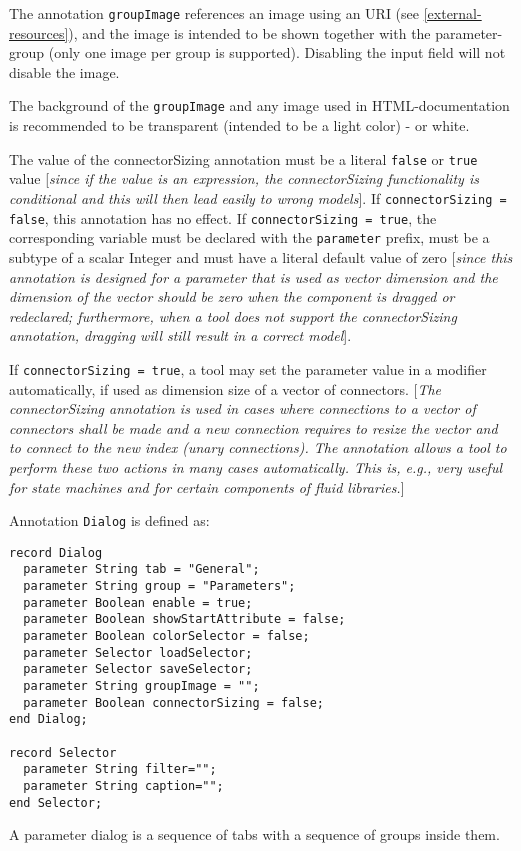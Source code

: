 The annotation \lstinline!groupImage! references an image using an URI (see
\autoref{external-resources}), and the image is intended to be shown together with the
parameter-group (only one image per group is supported). Disabling the
input field will not disable the image.

The background of the \lstinline!groupImage! and any image used in HTML-documentation is recommended to be transparent (intended to be a light color) - or white.

The value of the connectorSizing annotation must be a literal
\lstinline!false! or \lstinline!true! value {[}\emph{since if the value is an
expression, the connectorSizing functionality is conditional and this
will then lead easily to wrong models}{]}. If \lstinline!connectorSizing = false!, this annotation has no effect.
If \lstinline!connectorSizing = true!, the corresponding variable must be declared with the
\lstinline!parameter! prefix, must be a subtype of a scalar Integer and
must have a literal default value of zero {[}\emph{since this annotation
is designed for a parameter that is used as vector dimension and the
dimension of the vector should be zero when the component is dragged or
redeclared; furthermore, when a tool does not support the
connectorSizing annotation, dragging will still result in a correct
model}{]}.

If \lstinline!connectorSizing = true!, a tool may set the parameter value
in a modifier automatically, if used as dimension size of a vector of
connectors. {[}\emph{The connectorSizing annotation is used in cases
where connections to a vector of connectors shall be made and a new
connection requires to resize the vector and to connect to the new index
(unary connections). The annotation allows a tool to perform these two
actions in many cases automatically. This is, e.g., very useful for
state machines and for certain components of fluid libraries.}{]}

Annotation \lstinline!Dialog! is defined as:

\begin{lstlisting}[language=modelica]
record Dialog
  parameter String tab = "General";
  parameter String group = "Parameters";
  parameter Boolean enable = true;
  parameter Boolean showStartAttribute = false;
  parameter Boolean colorSelector = false;
  parameter Selector loadSelector;
  parameter Selector saveSelector;
  parameter String groupImage = "";
  parameter Boolean connectorSizing = false;
end Dialog;

record Selector
  parameter String filter="";
  parameter String caption="";
end Selector;
\end{lstlisting}
A parameter dialog is a sequence of tabs with a sequence of groups
inside them.

